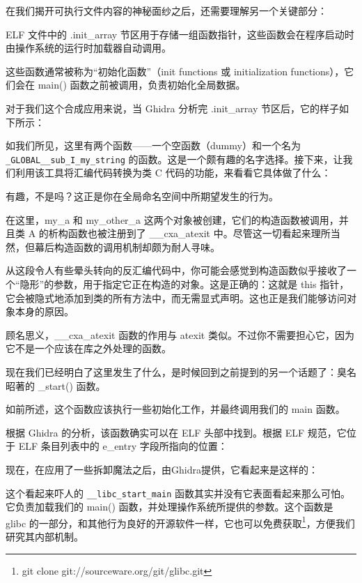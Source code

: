 在我们揭开可执行文件内容的神秘面纱之后，还需要理解另一个关键部分：

ELF 文件中的 .init\_array 节区用于存储一组函数指针，这些函数会在程序启动时由操作系统的运行时加载器自动调用。

这些函数通常被称为“初始化函数”（init functions 或 initialization functions），它们会在 main() 函数之前被调用，负责初始化全局数据。

对于我们这个合成应用来说，当 Ghidra 分析完 .init\_array 节区后，它的样子如下所示：


如我们所见，这里有两个函数——一个空函数（dummy）和一个名为 \verb|_GLOBAL__sub_I_my_string| 的函数。这是一个颇有趣的名字选择。接下来，让我们利用该工具将汇编代码转换为类 C 代码的功能，来看看它具体做了什么：


有趣，不是吗？这正是你在全局命名空间中所期望发生的行为。

在这里，my\_a 和 my\_other\_a 这两个对象被创建，它们的构造函数被调用，并且类 A 的析构函数也被注册到了 \_\_cxa\_atexit 中。尽管这一切看起来理所当然，但幕后构造函数的调用机制却颇为耐人寻味。

从这段令人有些晕头转向的反汇编代码中，你可能会感觉到构造函数似乎接收了一个“隐形”的参数，用于指定它正在构造的对象。这是正确的：这就是 this 指针，它会被隐式地添加到类的所有方法中，而无需显式声明。这也正是我们能够访问对象本身的原因。

顾名思义，\_\_cxa\_atexit 函数的作用与 atexit 类似。不过你不需要担心它，因为它不是一个应该在库之外处理的函数。

现在我们已经明白了这里发生了什么，是时候回到之前提到的另一个话题了：臭名昭著的 \_start() 函数。

如前所述，这个函数应该执行一些初始化工作，并最终调用我们的 main 函数。

根据 Ghidra 的分析，该函数确实可以在 ELF 头部中找到。根据 ELF 规范，它位于 ELF 条目列表中的 e\_entry 字段所指向的位置：


现在，在应用了一些拆卸魔法之后，由Ghidra提供，它看起来是这样的：


这个看起来吓人的 \verb|__libc_start_main| 函数其实并没有它表面看起来那么可怕。它负责加载我们的 main() 函数，并处理操作系统所提供的参数。这个函数是 glibc 的一部分，和其他行为良好的开源软件一样，它也可以免费获取\footnote{git clone git://sourceware.org/git/glibc.git}，方便我们研究其内部机制。

